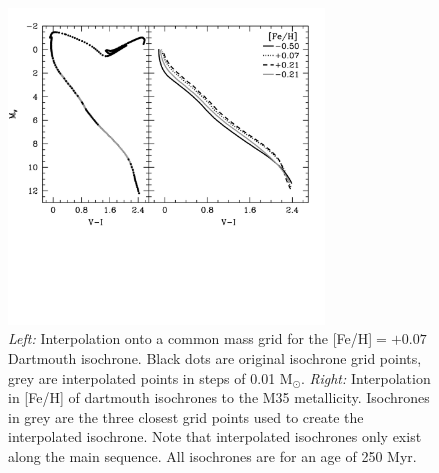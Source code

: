 \documentclass[iop]{emulateapj}
\begin{document}
\begin{figure} \centering
\includegraphics[trim = 0mm 248mm 20mm 20mm, clip, width=3.3in]{fig4.png}		%
\caption{\emph{Left:} Interpolation onto a common mass grid for the [Fe/H]$=+0.07$ Dartmouth isochrone. Black dots are original isochrone grid points, grey are interpolated points in steps of 0.01 M$_\odot$. \emph{Right:} Interpolation in [Fe/H] of dartmouth isochrones to the M35 metallicity. Isochrones in grey are the three closest grid points used to create the interpolated isochrone. Note that interpolated isochrones only exist along the main sequence. All isochrones are for an age of 250 Myr.\label{fig:isointerp}}
\end{figure}
\end{document}
